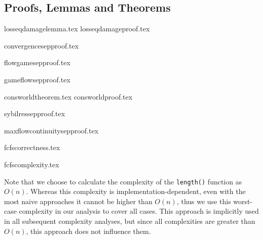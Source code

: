 \subsection{Proofs, Lemmas and Theorems}
{losseqdamagelemma.tex}
{losseqdamageproof.tex}

{convergencesepproof.tex}

{flowgamesepproof.tex}

{gameflowsepproof.tex}

{consworldtheorem.tex}
{consworldproof.tex}

{sybilressepproof.tex}

{maxflowcontinuitysepproof.tex}

{fcfscorrectness.tex}

{fcfscomplexity.tex}

Note that we choose to calculate the complexity of the \texttt{length()} function as $O\left(n\right)$. Whereas this
complexity is implementation-dependent, even with the most naive approaches it cannot be higher than $O\left(n\right)$,
thus we use this worst-case complexity in our analysis to cover all cases. This approach is implicitly used in all
subsequent complexity analyses, but since all complexities are greater than $O\left(n\right)$, this approach does not
influence them.
